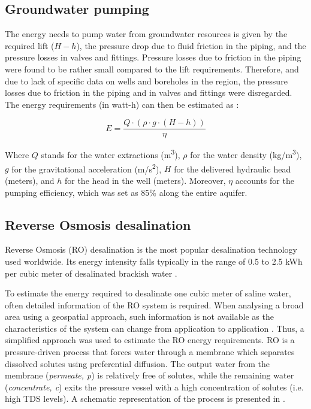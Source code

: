 \subsection{Groundwater pumping}\label{Sc:pumping}
The energy needs to pump water from groundwater resources is given by the required lift ($H-h$), the pressure drop due to fluid friction in the piping, and the pressure losses in valves and fittings. Pressure losses due to friction in the piping were found to be rather small compared to the lift requirements. Therefore, and due to lack of specific data on wells and boreholes in the region, the pressure losses due to friction in the piping and in valves and fittings were disregarded. The energy requirements (in watt-h) can then be estimated as  \cite{Groundwaterdependentirrigationcosts2017}:

\begin{equation}\label{eq:1}
E = \frac{Q\cdot(\rho\cdot g\cdot(H - h))}{\eta}
\end{equation}

Where $Q$ stands for the water extractions (m\textsuperscript{3}), $\rho$ for the water density (kg/m\textsuperscript{3}), $g$ for the gravitational acceleration (m/s\textsuperscript{2}), $H$ for the delivered hydraulic head (meters), and $h$ for the head in the well (meters). Moreover, $\eta$ accounts for the pumping efficiency, which was set as 85\% along the entire aquifer.

\subsection{Reverse Osmosis desalination}\label{Sc:RO}
Reverse Osmosis (RO) desalination is the most popular desalination technology used worldwide. Its energy intensity falls typically in the range of 0.5 to 2.5 kWh per cubic meter of desalinated brackish water \cite{Energyoptimalgroundwater2013}.

To estimate the energy required to desalinate one cubic meter of saline water, often detailed information of the RO system is required. When analysing a broad area using a geospatial approach, such information is not available as the characteristics of the system can change from application to application \cite{stillwellPredictingSpecificEnergy2016,aminfardMultilayeredSpatialMethodology2019}. Thus, a simplified approach was used to estimate the RO energy requirements. RO is a pressure-driven process that forces water through a membrane which separates dissolved solutes using preferential diffusion. The output water from the membrane (\textit{permeate, p}) is relatively free of solutes, while the remaining water (\textit{concentrate, c}) exits the pressure vessel with a high concentration of solutes (i.e. high TDS levels). A schematic representation of the process is presented in  \cite{crittenden_mwhs_2012}.

